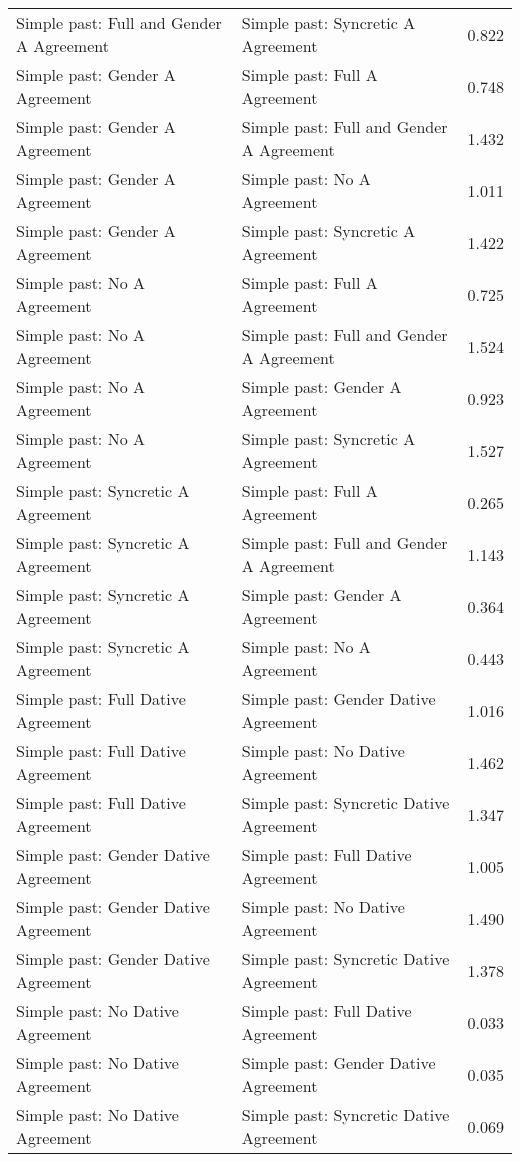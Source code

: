 \begin{longtable}{p{.4\linewidth}p{.4\linewidth}p{.1\linewidth}}
Simple past: Full and Gender A Agreement & Simple past: Syncretic A Agreement & 0.822\\
Simple past: Gender A Agreement & Simple past: Full A Agreement & 0.748\\
Simple past: Gender A Agreement & Simple past: Full and Gender A Agreement & 1.432\\
Simple past: Gender A Agreement & Simple past: No A Agreement & 1.011\\
Simple past: Gender A Agreement & Simple past: Syncretic A Agreement & 1.422\\
Simple past: No A Agreement & Simple past: Full A Agreement & 0.725\\
Simple past: No A Agreement & Simple past: Full and Gender A Agreement & 1.524\\
Simple past: No A Agreement & Simple past: Gender A Agreement & 0.923\\
Simple past: No A Agreement & Simple past: Syncretic A Agreement & 1.527\\
Simple past: Syncretic A Agreement & Simple past: Full A Agreement & 0.265\\
Simple past: Syncretic A Agreement & Simple past: Full and Gender A Agreement & 1.143\\
Simple past: Syncretic A Agreement & Simple past: Gender A Agreement & 0.364\\
Simple past: Syncretic A Agreement & Simple past: No A Agreement & 0.443\\
Simple past: Full Dative Agreement & Simple past: Gender Dative Agreement & 1.016\\
Simple past: Full Dative Agreement & Simple past: No Dative Agreement & 1.462\\
Simple past: Full Dative Agreement & Simple past: Syncretic Dative Agreement & 1.347\\
Simple past: Gender Dative Agreement & Simple past: Full Dative Agreement & 1.005\\
Simple past: Gender Dative Agreement & Simple past: No Dative Agreement & 1.490\\
Simple past: Gender Dative Agreement & Simple past: Syncretic Dative Agreement & 1.378\\
Simple past: No Dative Agreement & Simple past: Full Dative Agreement & 0.033\\
Simple past: No Dative Agreement & Simple past: Gender Dative Agreement & 0.035\\
Simple past: No Dative Agreement & Simple past: Syncretic Dative Agreement & 0.069\\

\end{longtable}
